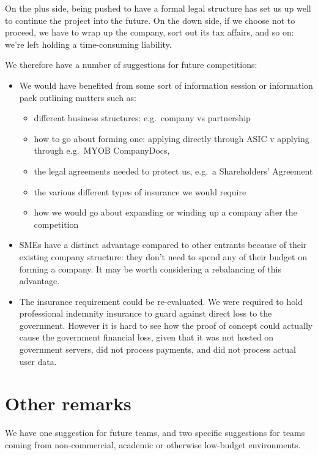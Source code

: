 \documentclass[12pt,a4paper,twosided]{article}
\begin{document}
On the plus side, being pushed to have a formal legal structure has set
us up well to continue the project into the future. On the down side, if
we choose not to proceed, we have to wrap up the company, sort out its
tax affairs, and so on: we're left holding a time-consuming liability.

We therefore have a number of suggestions for future competitions:

\begin{itemize}
\item
  We would have benefited from some sort of information session or
  information pack outlining matters such as:
\begin{itemize}
\item 
  different business structures: e.g.~company vs partnership
\item
  how to go about forming one: applying directly through ASIC v applying
  through e.g.~MYOB CompanyDocs,
\item
  the legal agreements needed to protect us, e.g.~a Shareholders'
  Agreement
\item
  the various different types of insurance we would require
\item
  how we would go about expanding or winding up a company after the
  competition
\end{itemize}
\item
  SMEs have a distinct advantage compared to other entrants because of
  their existing company structure: they don't need to spend any of
  their budget on forming a company. It may be worth considering a rebalancing
  of this advantage.
\item
  The insurance requirement could be re-evaluated. We were required to
  hold professional indemnity insurance to guard against direct loss to
  the government. However it is hard to see how the proof of concept
  could actually cause the government financial loss, given that it was
  not hosted on government servers, did not process payments, and did
  not process actual user data.
\end{itemize}

\newpage
\section{Other remarks}

We have one suggestion for future teams, and two specific suggestions
for teams coming from non-commercial, academic or otherwise low-budget
environments.
\end{document}
